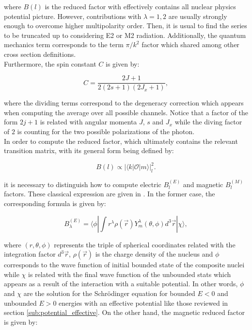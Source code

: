\documentclass[openany]{book}
\begin{document}
where $B(l)$ is the reduced factor with effectively contains all nuclear physics potential picture. However, contributions with $\lambda = 1, 2$ are usually strongly enough to overcome higher multipolarity order. Then, it is usual to find the series to be truncated up to considering E2 or M2 radiation. Additionally, the quantum mechanics term corresponds to the term $\pi/k^2$ factor which shared among other cross section definitions. \\

Furthermore, the spin constant $C$ is given by: 

\begin{equation} \label{eq:radiativeCapture_spinConstant}
	C =  \frac{ 2J + 1}{2(2s + 1) (2J_x + 1)}, 
\end{equation}

where the dividing terms correspond to the degeneracy correction which appears when computing the average over all possible channels. Notice that a factor of the form $2j +1$ is related with angular momenta $J$, $s$ and $J_x$ while the diving factor of $2$ is counting for the two possible polarizations of the photon.  \\

In order to compute the reduced factor, which ultimately contains the relevant transition matrix, with its general form being defined by:

\begin{equation}  \label{eq:radiativeCapture_reducedFactor}
	B(l) \propto   |{\langle k | \mathcal{O} | m \rangle}|^{2}_{l}.
\end{equation}

 it is necessary to distinguish how to compute electric $B^{(E)}_{l}$ and magnetic $B^{(M)}_{l}$ factors. These classical expression are given in \cite{goldhaber_weneser_1955}. In the former case, the corresponding formula is given by: 

\begin{equation} \label{eq:radiativeCapture_reduced_E}
	B^{(E)}_{\lambda} =   \langle \phi  |  \int  r^\lambda \rho(\vec r) Y^{\lambda}_{m} (\theta, \phi) d^3 \vec r | \chi \rangle, 
\end{equation}

where $(r, \theta, \phi)$ represents the triple of spherical coordinates related with the integration factor $d^3 \vec r $,  $\rho(\vec r)$ is the charge density of the nucleus and
$\phi$ corresponds to the wave function of initial bounded state of the composite nuclei while $\chi$ is related with the final wave function of the unbounded stats which appears as a result of the interaction with a suitable potential.  In other words, $\phi$ and $\chi$ are the solution for the Schrödinger equation for bounded $E < 0 $ and unbounded $E > 0$ energies with an effective potential like those reviewed in section \ref{sub:potential_effective}. On the other hand, the magnetic reduced factor is given by: 
\end{document}
